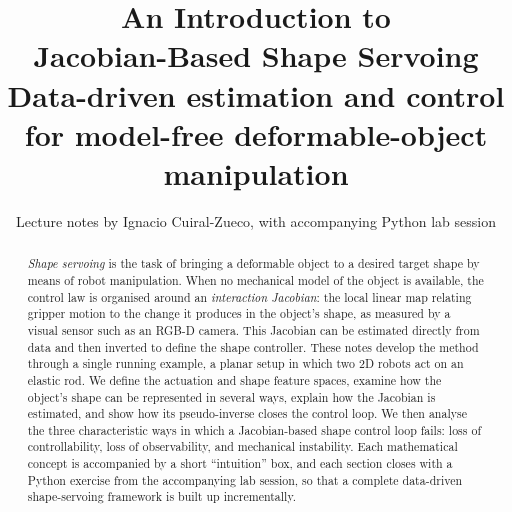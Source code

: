 \documentclass[11pt,a4paper]{article}
\title{\vspace{-2em}\textbf{\Huge An Introduction to\\[0.15em] Jacobian-Based Shape Servoing}\\[0.6em]
\Large \color{gray} Data-driven estimation and control for
model-free deformable-object manipulation}
\author{Lecture notes by Ignacio Cuiral-Zueco, with accompanying Python lab session}
\date{}
\begin{document}
\maketitle

\begin{abstract}
\noindent \emph{Shape servoing} is the task of bringing a deformable object to a desired
target shape by means of robot manipulation. When no mechanical model of the object is
available, the control law is organised around an \emph{interaction Jacobian}: the local
linear map relating gripper motion to the change it produces in the object's shape, as
measured by a visual sensor such as an RGB-D camera. This Jacobian can be estimated directly
from data and then inverted to define the shape controller. These notes develop the method
through a single running example, a planar setup in which two 2D robots act on an elastic rod.
We define the actuation and shape feature spaces, examine how the object's shape can be
represented in several ways, explain how the Jacobian is estimated, and show how its
pseudo-inverse closes the control loop. We then analyse the three characteristic ways in which
a Jacobian-based shape control loop fails: loss of controllability, loss of observability, and
mechanical instability. Each mathematical concept is accompanied by a short ``intuition'' box,
and each section closes with a Python exercise from the accompanying lab session, so that a
complete data-driven shape-servoing framework is built up incrementally.
\end{abstract}

\vspace{1em}
\tableofcontents
\vspace{1.5em}

\end{document}
